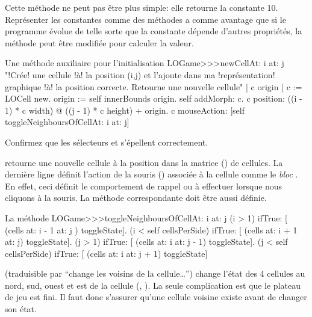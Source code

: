 \documentclass[a4paper,10pt,twoside]{book}
\begin{document}
Cette méthode ne peut pas être plus simple: elle retourne la constante
10. Représenter les constantes comme des méthodes a comme avantage que 
si le programme évolue de telle sorte que la constante dépende d'autres 
propriétés, la méthode peut être modifiée pour calculer la valeur.

\begin{method}[newCellAt:at:]{Une méthode auxiliaire pour l'initialisation}
LOGame>>>newCellAt: i at: j
   "!Crée! une cellule !à! la position (i,j) et l'ajoute dans ma !représentation! graphique !à! la position correcte. Retourne une nouvelle cellule"
   | c origin |
   c := LOCell new.
   origin := self innerBounds origin.
   self addMorph: c.
   c position: ((i - 1) * c width) @ ((j - 1) * c height) + origin.
   c mouseAction: [self toggleNeighboursOfCellAt: i at: j]
\end{method}

Confirmez que les sélecteurs  et  s'épellent correctement.

 retourne une nouvelle cellule  à la position \mbox{} dans la matrice () de cellules.
La dernière ligne définit l'action de la souris () associée à la cellule comme le \emph{bloc}
\mbox{.}
En effet, ceci définit le comportement de rappel ou \callback à effectuer lorsque nous cliquons à la souris.
La méthode correspondante doit être aussi définie.

\begin{method}[toggleNeighboursOfCellAt:at:]{La méthode \callback}
LOGame>>>toggleNeighboursOfCellAt: i at: j
   (i > 1) ifTrue: [ (cells at: i - 1 at: j ) toggleState].
   (i < self cellsPerSide) ifTrue: [ (cells at: i + 1 at: j) toggleState].
   (j > 1) ifTrue: [ (cells at: i  at: j - 1) toggleState].
   (j < self cellsPerSide) ifTrue: [ (cells at: i at: j + 1) toggleState]
\end{method}

 (traduisible par ``change les
voisins de la cellule\ldots'') change l'état des 4 cellules au nord, sud, ouest et est de la cellule (, ). La seule complication est que le plateau de jeu est fini. Il faut donc s'assurer qu'une cellule voisine existe avant de changer son état.
\end{document}
